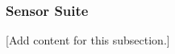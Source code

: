 
\subsubsection{Sensor Suite}
\label{subsubsec:design_2_4_2_sensor_suite}

[Add content for this subsection.]
